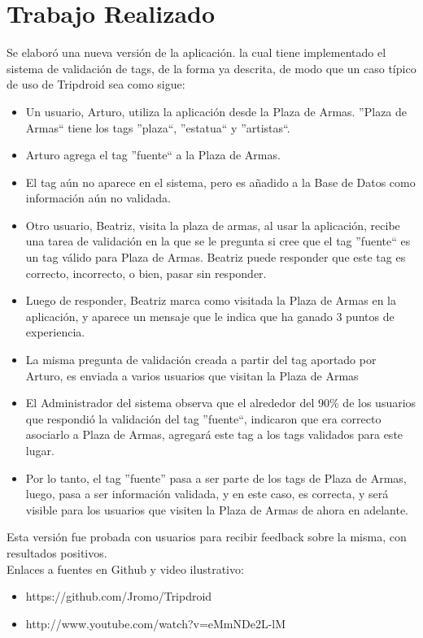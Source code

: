 \documentclass{sig-alternate}
\begin{document}
\section{Trabajo Realizado}

Se elaboró una nueva versión de la aplicación. la cual tiene implementado el sistema de validación de tags, de la forma ya descrita, de modo que un caso típico de uso de Tripdroid sea como sigue:\\

\begin{itemize}
 \item Un usuario, Arturo, utiliza la aplicación desde la Plaza de Armas. ''Plaza de Armas`` tiene los tags ''plaza``, ''estatua`` y ''artistas``.
 \item Arturo agrega el tag ''fuente`` a la Plaza de Armas.
 \item El tag aún no aparece en el sistema, pero es añadido a la Base de Datos como información aún no validada.
 \item Otro usuario, Beatriz, visita la plaza de armas, al usar la aplicación, recibe una tarea de validación en la que se le pregunta si cree que el tag ''fuente`` es un tag válido para Plaza de Armas. Beatriz puede responder que este tag es correcto, incorrecto, o bien, pasar sin responder.
 \item Luego de responder, Beatriz marca como visitada la Plaza de Armas en la aplicación, y aparece un mensaje que le indica que ha ganado 3 puntos de experiencia.
 \item La misma pregunta de validación creada a partir del tag aportado por Arturo, es enviada a varios usuarios que visitan la Plaza de Armas
 \item El Administrador del sistema observa que el alrededor del 90\% de los usuarios que respondió la validación del tag ''fuente``, indicaron que era correcto asociarlo a Plaza de Armas, agregará este tag a los tags validados para este lugar.
 \item Por lo tanto, el tag ''fuente'' pasa a ser parte de los tags de Plaza de Armas, luego, pasa a ser información validada, y en este caso, es correcta, y será visible para los usuarios que visiten la Plaza de Armas de ahora en adelante.
\end{itemize}

Esta versión fue probada con usuarios para recibir feedback sobre la misma, con resultados positivos.\\

Enlaces a fuentes en Github y video ilustrativo:
\begin{itemize}
\item https://github.com/Jromo/Tripdroid
\item http://www.youtube.com/watch?v=eMmNDe2L-lM
\end{itemize}
\end{document}
